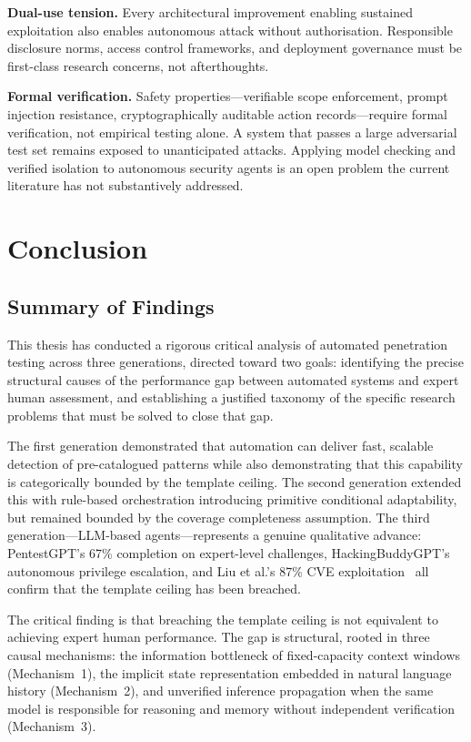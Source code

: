 \documentclass[12pt,a4paper,oneside,openany]{book}
\begin{document}
\textbf{Dual-use tension.} Every architectural improvement enabling sustained exploitation also enables autonomous attack without authorisation. Responsible disclosure norms, access control frameworks, and deployment governance must be first-class research concerns, not afterthoughts.

\textbf{Formal verification.} Safety properties---verifiable scope enforcement, prompt injection resistance, cryptographically auditable action records---require formal verification, not empirical testing alone. A system that passes a large adversarial test set remains exposed to unanticipated attacks. Applying model checking and verified isolation to autonomous security agents is an open problem the current literature has not substantively addressed.


\chapter{Conclusion}
\label{ch:conclusion}

\section{Summary of Findings}

This thesis has conducted a rigorous critical analysis of automated penetration testing across three generations, directed toward two goals: identifying the precise structural causes of the performance gap between automated systems and expert human assessment, and establishing a justified taxonomy of the specific research problems that must be solved to close that gap.

The first generation demonstrated that automation can deliver fast, scalable detection of pre-catalogued patterns while also demonstrating that this capability is categorically bounded by the template ceiling. The second generation extended this with rule-based orchestration introducing primitive conditional adaptability, but remained bounded by the coverage completeness assumption. The third generation---LLM-based agents---represents a genuine qualitative advance: PentestGPT's 67\% completion on expert-level challenges, HackingBuddyGPT's autonomous privilege escalation, and Liu et al.'s 87\% CVE exploitation~\citep{liu2024gpts} all confirm that the template ceiling has been breached.

The critical finding is that breaching the template ceiling is not equivalent to achieving expert human performance. The gap is structural, rooted in three causal mechanisms: the information bottleneck of fixed-capacity context windows (Mechanism~1), the implicit state representation embedded in natural language history (Mechanism~2), and unverified inference propagation when the same model is responsible for reasoning and memory without independent verification (Mechanism~3).
\end{document}
